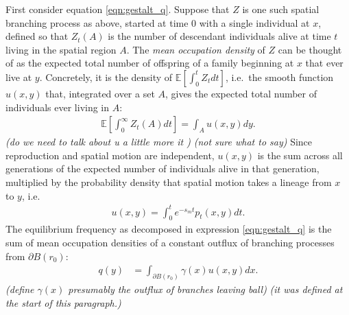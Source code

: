 \documentclass{article}
\newcommand{\E}{\mathbb{E}}
\newcommand{\gc}[1]{{\it\color{green}(#1)} }
\newcommand{\plr}[1]{{\it\color{blue}(#1)}}
\begin{document}
First consider equation \eqref{eqn:gestalt_q}.
Suppose that $Z$ is one such spatial branching process as above, started at time 0 with a single individual at $x$,
defined so that $Z_t(A)$ is the number of descendant individuals alive at time $t$ living in the spatial region $A$.
The \emph{mean occupation density} of $Z$ can be thought of 
as the expected total number of offspring of a family beginning at $x$ that ever live at $y$.
Concretely, it is the density of $\E[\int_0^t Z_t dt]$,
i.e.\ the smooth function $u(x,y)$ that, integrated over a set $A$, 
gives the expected total number of individuals ever living in $A$:
\begin{align} \label{eqn:occupation_density_defn}
    \E\left[ \int_0^\infty Z_t(A) dt \right] = \int_A u(x,y) dy .
\end{align}
\gc{do we need to talk about u a little more it }
\plr{not sure what to say}
Since reproduction and spatial motion are independent,
$u(x,y)$ is the sum across all generations of the expected number of individuals alive in that generation,
multiplied by the probability density that spatial motion takes a lineage from $x$ to $y$,
i.e.\
\begin{align}
    u(x,y) = \int_0^t e^{-s_m t} p_t(x,y) dt .
\end{align}
The equilibrium frequency as decomposed in expression \eqref{eqn:gestalt_q} 
is the sum of mean occupation densities of a constant outflux of branching processes
from $\partial B(r_0)$:
\begin{align} \label{eqn:occupation_integral}
    q(y) &= \int_{\partial B(r_0)} \gamma(x) u(x,y) dx  . %
\end{align}
\gc{define $\gamma(x)$ presumably the outflux of branches leaving ball}
\plr{it was defined at the start of this paragraph.}
\end{document}
